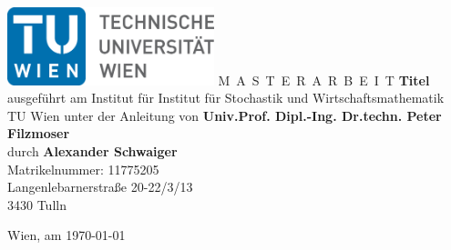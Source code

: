   \vspace*{-2cm}
  \begin{center}
    \includegraphics[width=0.45\textwidth]{TULogo.eps}
    \vskip 1cm%
    {\LARGE M~\Large A~S~T~E~R~A~R~B~E~I~T}
    \vskip 8mm
    {\huge\bfseries  Titel}
    \vskip 1cm
    \large 
    ausgeführt am    
    \vskip 0.75cm
    {\Large Institut für Institut für Stochastik und Wirtschaftsmathematik}\\[1ex]
    {\Large TU Wien}
    \vskip0.75cm
    unter der Anleitung von
    \vskip0.75cm
    {\Large\bfseries Univ.Prof. Dipl.-Ing. Dr.techn. Peter Filzmoser}\\[1ex]
    \vskip 0.5cm
    durch
    \vskip 0.5cm
    {\Large\bfseries Alexander Schwaiger}\\[1ex]
    Matrikelnummer: { 11775205}\\[1ex]
    {Langenlebarnerstraße 20-22/3/13}\\[1ex]
    {3430 Tulln}
  \end{center}
  
  \vfill
  
  \small
  Wien, am {\today} %
  \vspace*{-15mm}